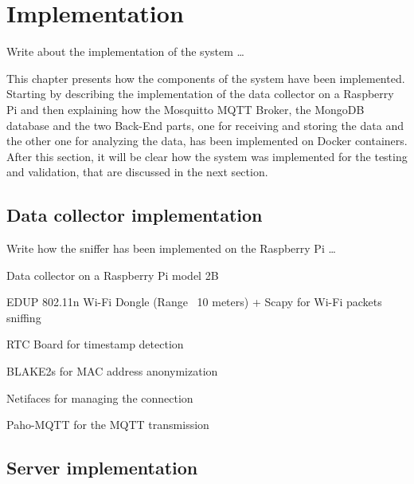 \chapter{Implementation}
\label{cha:implementation}
\vspace{0.4 cm} 

Write about the implementation of the system \dots

This chapter presents how the components of the system have been implemented.
Starting by describing the implementation of the data collector on a Raspberry Pi and then explaining how the Mosquitto MQTT Broker, the MongoDB database and the two Back-End parts, one for receiving and storing the data and the other one for analyzing the data, has been implemented on Docker containers. After this section, it will be clear how the system was implemented for the testing and validation, that are discussed in the next section.


\section{Data collector implementation}
\label{sec:collector}
\vspace{0.2 cm} 

Write how the sniffer has been implemented on the Raspberry Pi \dots

Data collector on a Raspberry Pi model 2B

EDUP 802.11n Wi-Fi Dongle (Range ~10 meters) + Scapy for Wi-Fi packets sniffing

RTC Board for timestamp detection

BLAKE2s for MAC address anonymization

Netifaces for managing the connection

Paho-MQTT for the MQTT transmission





\section{Server implementation}
\label{sec:server}
\vspace{0.2 cm} 

